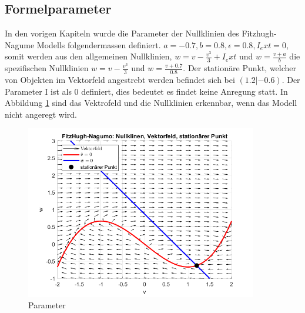 \begin{refsection}
\subsection{Formelparameter}
In den vorigen Kapiteln wurde die Parameter der Nullklinien des Fitzhugh-Nagume Modells folgendermassen definiert.
\(a = -0.7, b = 0.8, \epsilon = 0.8, I_ext = 0\), somit werden aus den allgemeinen Nullklinien, \( w = v - \frac{v^3}{3} + I_ext\)
und \(w = \frac{v + a}{b}\) die spezifischen Nullklinien \( w = v - \frac{v^3}{3}\)
und \(w = \frac{v + 0.7}{0.8}\).
Der stationäre Punkt, welcher von Objekten im Vektorfeld angestrebt werden befindet sich bei \((1.2 |-0.6)\).
Der Parameter I ist als 0 definiert, dies bedeutet es findet keine Anregung statt.
In Abbildung \ref{fig:Parameter} sind das Vektrofeld und die Nullklinien erkennbar, wenn das Modell nicht angeregt wird.
\begin{figure}[H]
    \centering
    \includegraphics[width=0.9\textwidth]{papers/nerven/Bilder/Anregung1.png}
    \caption{Parameter}
    \label{fig:Parameter}
\end{figure}

\end{refsection}
